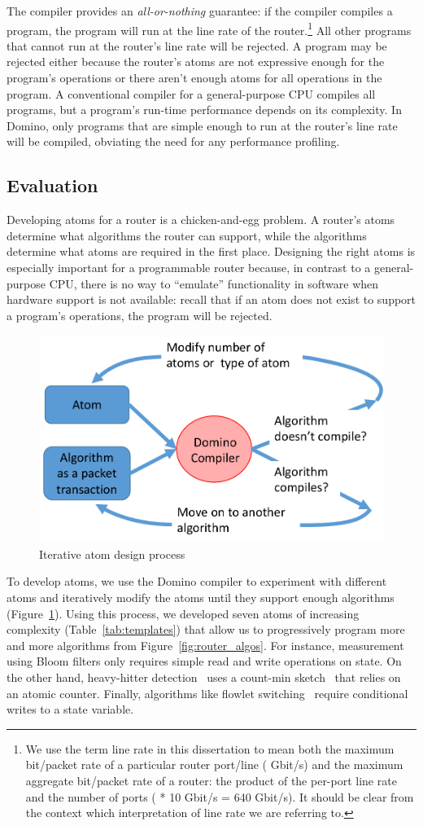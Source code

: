 The compiler provides an {\em all-or-nothing} guarantee: if the compiler
compiles a program, the program will run at the line rate of the
router.\footnote{We use the term line rate in this dissertation to mean both
the maximum bit/packet rate of a particular router port/line ( Gbit/s)
and the maximum aggregate bit/packet rate of a router: the product of the
per-port line rate and the number of ports ( * 10 Gbit/s = 640 Gbit/s).
It should be clear from the context which interpretation of line rate we are
referring to. } All other programs that cannot run at the router's line rate
will be rejected. A program may be rejected either because the router's atoms
are not expressive enough for the program's operations or there aren't enough
atoms for all operations in the program. A conventional compiler for a
general-purpose CPU compiles all programs, but a program's run-time performance
depends on its complexity. In Domino, only programs that are simple enough to
run at the router's line rate will be compiled, obviating the need for any
performance profiling.

\subsection{Evaluation}
Developing atoms for a router is a chicken-and-egg problem. A router's atoms
determine what algorithms the router can support, while the algorithms
determine what atoms are required in the first place. Designing the right atoms
is especially important for a programmable router because, in contrast to a
general-purpose CPU, there is no way to ``emulate'' functionality in software
when hardware support is not available: recall that if an atom does not exist
to support a program's operations, the program will be rejected.

\begin{figure}
\centering
\includegraphics[width=0.5\columnwidth]{iterative_design_process.pdf}
\caption{Iterative atom design process}
\label{fig:iterative_design}
\end{figure}

To develop atoms, we use the Domino compiler to experiment with different atoms
and iteratively modify the atoms until they support enough algorithms
(Figure~\ref{fig:iterative_design}).  Using this process, we developed seven
atoms of increasing complexity (Table~\ref{tab:templates}) that allow us to
progressively program more and more algorithms from
Figure~\ref{fig:router_algos}. For instance, measurement using Bloom filters
only requires simple read and write operations on state. On the other hand,
heavy-hitter detection~\cite{opensketch} uses a count-min sketch~\cite{cormode}
that relies on an atomic counter. Finally, algorithms like flowlet
switching~\cite{flowlets} require conditional writes to a state variable.

